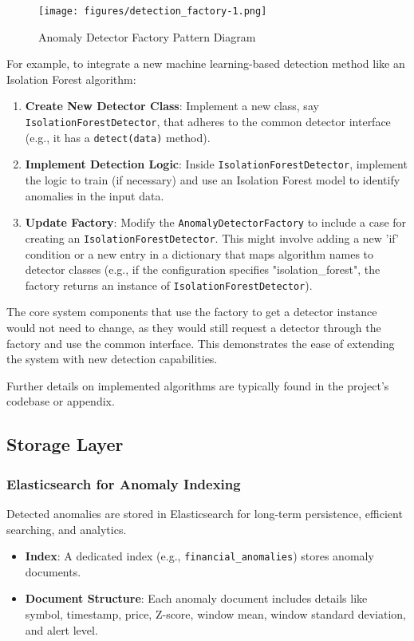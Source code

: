 \begin{figure}[H]
    \centering
    \texttt{[image: figures/detection\_factory-1.png]}
    \caption{Anomaly Detector Factory Pattern Diagram}
    \label{fig:anomaly_detector_factory_diagram}
\end{figure}

For example, to integrate a new machine learning-based detection method like an Isolation Forest algorithm:
\begin{enumerate}
    \item \textbf{Create New Detector Class}: Implement a new class, say \texttt{IsolationForestDetector}, that adheres to the common detector interface (e.g., it has a \texttt{detect(data)} method).
    \item \textbf{Implement Detection Logic}: Inside \texttt{IsolationForestDetector}, implement the logic to train (if necessary) and use an Isolation Forest model to identify anomalies in the input data.
    \item \textbf{Update Factory}: Modify the \texttt{AnomalyDetectorFactory} to include a case for creating an \texttt{IsolationForestDetector}. This might involve adding a new 'if' condition or a new entry in a dictionary that maps algorithm names to detector classes (e.g., if the configuration specifies "isolation\_forest", the factory returns an instance of \texttt{IsolationForestDetector}).
\end{enumerate}
The core system components that use the factory to get a detector instance would not need to change, as they would still request a detector through the factory and use the common interface. This demonstrates the ease of extending the system with new detection capabilities.

Further details on implemented algorithms are typically found in the project's codebase or appendix.

\subsection{Storage Layer}

\subsubsection{Elasticsearch for Anomaly Indexing}

Detected anomalies are stored in Elasticsearch for long-term persistence, efficient searching, and analytics.
\begin{itemize}
    \item \textbf{Index}: A dedicated index (e.g., \texttt{financial\_anomalies}) stores anomaly documents.
    \item \textbf{Document Structure}: Each anomaly document includes details like symbol, timestamp, price, Z-score, window mean, window standard deviation, and alert level.
\end{itemize}

